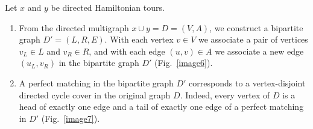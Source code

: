 \documentclass[runningheads]{llncs}
\begin{document}
Let $x$ and $y$ be directed Hamiltonian tours.
\begin{enumerate}
	\item [Step 1.] From the directed multigraph $x \cup y = D = (V, A)$, we construct a bipartite graph $D' = (L, R, E)$. With each vertex $v \in V$ we associate a pair of vertices $v_L \in L$ and $v_R \in R$, and with each edge $(u,v) \in A$ we associate a new edge $(u_L, v_R)$ in the bipartite graph $D'$ (Fig.~\ref{image6}). %
	\item [Step 2.] A perfect matching in the bipartite graph $D'$ corresponds to a vertex-disjoint directed cycle cover in the original graph $D$.
	Indeed, every vertex of $D$ is a head of exactly one edge and a tail of exactly one edge of a perfect matching in $D'$ (Fig.~\ref{image7}). %
\end{enumerate}
\end{document}

